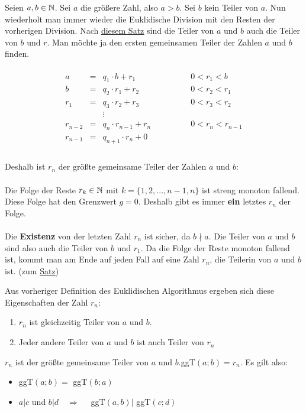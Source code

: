 \begin{Definition} 

Seien $a,b \in \mathbb{N}$. Sei $a$ die größere Zahl, also $a > b$. Sei $b$ kein Teiler von $a$. Nun wiederholt man immer wieder die Euklidische Division mit den Resten der vorherigen Division. Nach \hyperlink{teiler_ab_teiler_br}{\textcolor{titlepagecolor}{\underline{diesem Satz}}} sind die Teiler von $a$ und $b$ auch die Teiler von $b$ und $r$. Man möchte ja den ersten gemeinsamen Teiler der Zahlen $a$ und $b$ finden.\\\\
$$
\begin{array}{rccl}
a & = & q_{1} \cdot b + r_{1} \qquad \qquad &0 < r_{1}  < b \\
b & = & q_{2} \cdot r_{1} + r_{2} \qquad \qquad &0 < r_{2}  < r_{1} \\
r_{1} & = & q_{3} \cdot r_{2} + r_{3} \qquad \qquad &0 < r_{3}  < r_{2} \\
 && \vdots & \\
r_{n-2} & = & q_{n} \cdot r_{n-1} + r_{n} \qquad \qquad &0 < r_{n}  < r_{n-1} \\
r_{n-1} & = & q_{n+1} \cdot r_{n} + 0 \qquad \qquad &  \\
\end{array}
$$\\
Deshalb ist $r_{n}$ der größte gemeinsame Teiler der Zahlen $a$ und $b$:\\\\
Die Folge der Reste $r_{k} \in \mathbb{N}$ mit $k = \{1, 2, ..., n-1, n\}$ ist streng monoton fallend. Diese Folge hat den Grenzwert $g = 0$. Deshalb gibt es immer \textbf{ein} letztes $r_{n}$ der Folge.\\\\
Die \textbf{Existenz} von der letzten Zahl $r_{n}$ ist sicher, da $b \nmid a$. Die Teiler von $a$ und $b$ sind also auch die Teiler von $b$ und $r_{1}$. Da die Folge der Reste monoton fallend ist, kommt man am Ende auf jeden Fall auf eine Zahl $r_{n}$, die Teilerin von $a$ und $b$ ist. (zum \hyperlink{teiler_ab_teiler_br}{\textcolor{titlepagecolor}{\underline{Satz}}})
\end{Definition}

\begin{Theorem}
Aus vorheriger Definition des Euklidischen Algorithmus ergeben sich diese Eigenschaften der Zahl $r_{n}$:
\begin{enumerate}
\item $r_{n}$ ist gleichzeitig Teiler von $a$ und $b$.
\item Jeder andere Teiler von $a$ und $b$ ist auch Teiler von $r_{n}$
\end{enumerate}
$r_{n}$ ist der größte gemeinsame Teiler von $a$ und $b$.\quad ggT$(a;b) = r_{n}$. Es gilt also:
\begin{itemize}
\item ggT$(a;b) =$ ggT$(b;a)$
\item $a | c$ und $b | d \quad \Rightarrow \quad$ ggT$(a,b) |$ ggT$(c;d)$\\
\end{itemize}
\end{Theorem}

